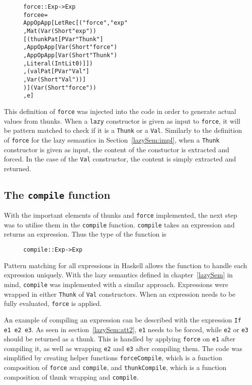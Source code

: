 \begin{figure}[H]
\begin{alltt}
force :: Exp -> Exp
force e =
  App OpApp [LetRec [("force", "exp"
                     , Mat (Var (Short "exp"))
                       [(thunkPat [PVar "Thunk"]
                        , App OpApp [Var (Short "force")
                                    , App OpApp [Var (Short "Thunk")
                                                , Literal (IntLit 0)]])
                       ,(valPat [PVar "Val"]
                        , Var (Short "Val"))]
                     )] (Var (Short "force"))
            , e]
\end{alltt}
\end{figure}

This definition of \texttt{force} was injected into the code in order to
generate actual values from thunks. When a \texttt{lazy} constructor is given
as input to \texttt{force}, it will be pattern matched to check if it is a
\texttt{Thunk} or a \texttt{Val}. Similarly to the definition of \texttt{force}
for the lazy semantics in Section~\ref{lazySem:impl}, when a \texttt{Thunk}
constructor is given as input, the content of the constuctor is extracted and
forced. In the case of the \texttt{Val} constructor, the content is simply
extracted and returned.

\subsection{The \texttt{compile} function}
With the important elements of thunks and \texttt{force} implemented, the next
step was to utilise them in the \texttt{compile} function. 
\texttt{compile} takes an expression and returns an expression. Thus the type of
the function is

\begin{figure}[H]
\begin{alltt}
  compile :: Exp -> Exp
\end{alltt}
\end{figure}

\noindent Pattern matching for all expressions in Haskell allows the function to
handle each expression uniquely. With the lazy semantics defined in
chapter~\ref{lazySem} in mind, \texttt{compile} was implemented with a similar
approach. Expressions were wrapped in either \texttt{Thunk} of
\texttt{Val} constructors. When an expression needs to be fully evaluated,
\texttt{force} is applied.

An example of compiling an expression can be described with the expression
\texttt{If e1 e2 e3}. As seen in section~\ref{lazySem:att2}, \texttt{e1} needs
to be forced, while \texttt{e2} or \texttt{e3} should be returned as a thunk.
This is handled by applying \texttt{force} on \texttt{e1} after compiling it,
as well as wrapping \texttt{e2} and \texttt{e3} after compiling them.
The code was simplified by creating helper functions \texttt{forceCompile},
which is a function composition of \texttt{force} and \texttt{compile}, and
\texttt{thunkCompile}, which is a function composition of thunk wrapping and
\texttt{compile}.

